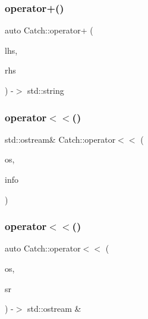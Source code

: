 \mbox{\label{namespaceCatch_a764a678121fa11c590a53618baa47680}} 
\subsubsection{\texorpdfstring{operator+()}{operator+()}\hspace{0.1cm}{\footnotesize\ttfamily [4/4]}}
{\footnotesize\ttfamily auto Catch\+::operator+ (\begin{DoxyParamCaption}\item[{char const $\ast$}]{lhs,  }\item[{\mbox{\hyperlink{classCatch_1_1StringRef}{String\+Ref}} const \&}]{rhs }\end{DoxyParamCaption}) -\/$>$  std\+::string}

\mbox{\label{namespaceCatch_a6ec18b5054d7fdfdde861c580b082995}} 
\subsubsection{\texorpdfstring{operator$<$$<$()}{operator<<()}\hspace{0.1cm}{\footnotesize\ttfamily [1/2]}}
{\footnotesize\ttfamily std\+::ostream\& Catch\+::operator$<$$<$ (\begin{DoxyParamCaption}\item[{std\+::ostream \&}]{os,  }\item[{\mbox{\hyperlink{structCatch_1_1SourceLineInfo}{Source\+Line\+Info}} const \&}]{info }\end{DoxyParamCaption})}

\mbox{\label{namespaceCatch_a5e37b333d756a28e12d44977f063af43}} 
\subsubsection{\texorpdfstring{operator$<$$<$()}{operator<<()}\hspace{0.1cm}{\footnotesize\ttfamily [2/2]}}
{\footnotesize\ttfamily auto Catch\+::operator$<$$<$ (\begin{DoxyParamCaption}\item[{std\+::ostream \&}]{os,  }\item[{\mbox{\hyperlink{classCatch_1_1StringRef}{String\+Ref}} const \&}]{sr }\end{DoxyParamCaption}) -\/$>$  std\+::ostream \&}

